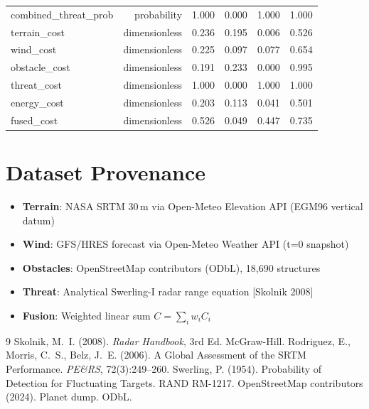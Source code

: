 \documentclass{article}
\begin{document}
\begin{longtable}{lrrrrr}
combined\_threat\_prob & probability & 1.000 & 0.000 & 1.000 & 1.000 \\
terrain\_cost & dimensionless & 0.236 & 0.195 & 0.006 & 0.526 \\
wind\_cost & dimensionless & 0.225 & 0.097 & 0.077 & 0.654 \\
obstacle\_cost & dimensionless & 0.191 & 0.233 & 0.000 & 0.995 \\
threat\_cost & dimensionless & 1.000 & 0.000 & 1.000 & 1.000 \\
energy\_cost & dimensionless & 0.203 & 0.113 & 0.041 & 0.501 \\
fused\_cost & dimensionless & 0.526 & 0.049 & 0.447 & 0.735 \\

\end{longtable}

\section*{Dataset Provenance}
\begin{itemize}
  \item \textbf{Terrain}: NASA SRTM 30\,m via Open-Meteo Elevation API (EGM96 vertical datum)
  \item \textbf{Wind}: GFS/HRES forecast via Open-Meteo Weather API (t=0 snapshot)
  \item \textbf{Obstacles}: OpenStreetMap contributors (ODbL), 18,690 structures
  \item \textbf{Threat}: Analytical Swerling-I radar range equation [Skolnik 2008]
  \item \textbf{Fusion}: Weighted linear sum $C = \sum_i w_i C_i$
\end{itemize}

\begin{thebibliography}{9}
 Skolnik, M.~I. (2008). \textit{Radar Handbook}, 3rd Ed. McGraw-Hill.
 Rodriguez, E., Morris, C.~S., Belz, J.~E. (2006). A Global Assessment of the SRTM Performance. \textit{PE\&RS}, 72(3):249--260.
 Swerling, P. (1954). Probability of Detection for Fluctuating Targets. RAND RM-1217.
 OpenStreetMap contributors (2024). Planet dump. ODbL.
\end{thebibliography}
\end{document}
